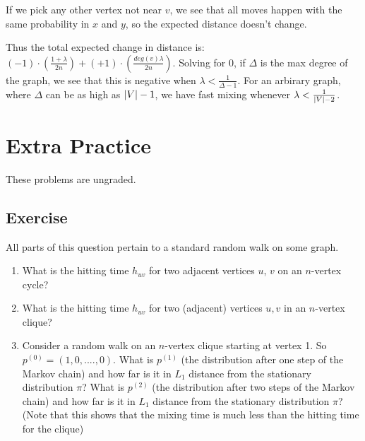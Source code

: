\documentclass{article}
\newcounter{counter}
\newcommand{\Exercise}{Exercise \stepcounter{counter}\thecounter}
\DeclarePairedDelimiter\abs{\lvert}{\rvert}%
\begin{document}
    \vspace{3mm}
  If we pick any other vertex not near $v$, we see that all moves happen with
  the same probability in $x$ and $y$, so the expected distance doesn't
  change.

    \vspace{3mm}
  Thus the total expected change in distance is:
  $(-1) \cdot (\frac{1 + \lambda}{2n}) + (+1) \cdot
  (\frac{deg(v)\lambda}{2n})$. Solving for $0$, if $\Delta$ is the max degree
  of the graph, we see that this is negative
  when $\lambda < \frac{1}{\Delta - 1}$. For an arbirary graph, where $\Delta$
  can be as high as $\abs{V} - 1$, we have fast mixing whenever $\lambda <
  \frac{1}{\abs{V} - 2}$.
\pagebreak

\section*{Extra Practice}
These problems are ungraded.

\subsection*{\Exercise}
All parts of this question pertain to a standard random walk on some graph. 
  \begin{enumerate}[label=(\alph*)]
    \item What is the hitting time $h_{uv}$ for two adjacent vertices $u$, $v$ on an $n$-vertex cycle?
    \item What is the hitting time $h_{uv}$ for two (adjacent) vertices $u,v$ in an $n$-vertex clique?
    \item Consider a random walk on an $n$-vertex clique starting at vertex 1. So $p^{(0)} = (1,0,....,0)$. What is $p^{(1)}$ (the distribution after one step of the Markov chain) and how far is it in $L_1$ distance from the stationary distribution $\pi$?     What is $p^{(2)}$ (the distribution after two steps of the Markov chain) and how far is it in $L_1$ distance from the stationary distribution $\pi$?  (Note that this shows that the mixing time is much less than the hitting time for the clique)   
    \end{enumerate}
\end{document}
